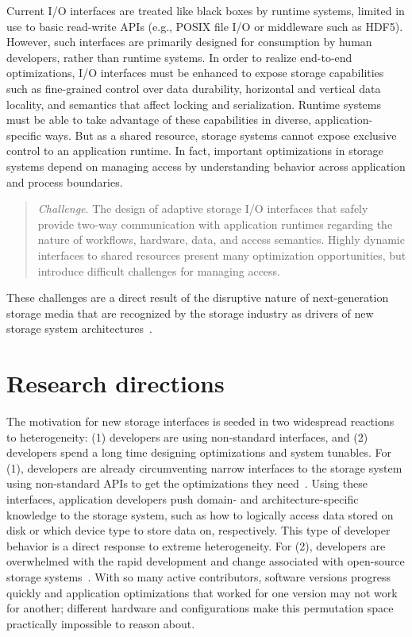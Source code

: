 \documentclass{sig-alternate}
\begin{document}
Current I/O interfaces are treated like black boxes by runtime systems, limited
in use to basic read-write APIs (e.g., POSIX file I/O or middleware such as
HDF5). However, such interfaces are primarily designed for consumption by human
developers, rather than runtime systems.  In order to realize end-to-end
optimizations, I/O interfaces must be enhanced to expose storage capabilities
such as fine-grained control over data durability, horizontal and vertical data
locality, and semantics that affect locking and serialization. Runtime systems
must be able to take advantage of these capabilities in diverse, application-specific ways.
But as a shared resource, storage systems cannot expose exclusive control to an
application runtime. In fact, important optimizations in storage systems depend
on managing access by understanding behavior across application and process boundaries.

\begin{quote}
  \emph{Challenge}. The design of adaptive storage I/O interfaces that safely
  provide two-way communication with application runtimes regarding the nature of
  workflows, hardware, data, and access semantics. Highly dynamic interfaces to shared resources
  present many optimization opportunities, but introduce difficult challenges for
  managing access.
\end{quote}

These challenges are a direct result of the disruptive nature of
next-generation storage media that are recognized by the storage industry as
drivers of new storage system architectures~\cite{samuels:oss16}.

\section{Research directions}

The motivation for new storage interfaces is seeded in two widespread reactions
to heterogeneity: (1) developers are using non-standard interfaces, and (2)
developers spend a long time designing optimizations and system tunables.  For
(1), developers are already circumventing narrow interfaces to the storage
system using non-standard APIs to get the optimizations they
need~\cite{sevilla:es17-malac}.  Using these interfaces, application developers
push domain- and architecture-specific knowledge to the storage system, such as
how to logically access data stored on disk or which device type to store data
on, respectively.  This type of developer behavior is a direct response to
extreme heterogeneity.  For (2), developers are overwhelmed with the rapid
development and change associated with open-source storage
systems~\cite{watkins:hot17-declstor}. With so many active contributors,
software versions progress quickly and application optimizations that worked
for one version may not work for another; different hardware and configurations
make this permutation space practically impossible to reason about.
\end{document}
